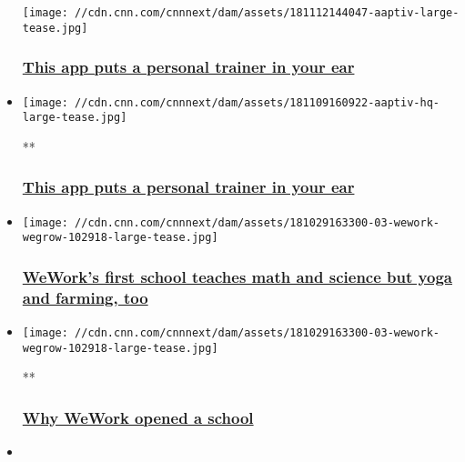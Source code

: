 \begin{itemize}
  \texttt{[image: //cdn.cnn.com/cnnnext/dam/assets/181112144047-aaptiv-large-tease.jpg]}

  \hypertarget{this-app-puts-a-personal-trainer-in-your-ear}{%
  \subsubsection{\texorpdfstring{\href{/2018/11/12/tech/aaptiv-app/index.html}{This
  app puts a personal trainer in your
  ear}}{This app puts a personal trainer in your ear}}\label{this-app-puts-a-personal-trainer-in-your-ear}}
\item
  \href{/videos/business/2018/11/09/aaptiv-personal-trainer-audio.cnn-business}{}

  \texttt{[image: //cdn.cnn.com/cnnnext/dam/assets/181109160922-aaptiv-hq-large-tease.jpg]}

  **

  \hypertarget{this-app-puts-a-personal-trainer-in-your-ear-1}{%
  \subsubsection{\texorpdfstring{\href{/videos/business/2018/11/09/aaptiv-personal-trainer-audio.cnn-business}{This
  app puts a personal trainer in your
  ear}}{This app puts a personal trainer in your ear}}\label{this-app-puts-a-personal-trainer-in-your-ear-1}}
\item
  \href{/2018/10/30/tech/wework-school-wegrow/index.html}{}

  \texttt{[image: //cdn.cnn.com/cnnnext/dam/assets/181029163300-03-wework-wegrow-102918-large-tease.jpg]}

  \hypertarget{weworks-first-school-teaches-math-and-science-but-yoga-and-farming-too}{%
  \subsubsection{\texorpdfstring{\href{/2018/10/30/tech/wework-school-wegrow/index.html}{WeWork's
  first school teaches math and science but yoga and farming,
  too}}{WeWork's first school teaches math and science but yoga and farming, too}}\label{weworks-first-school-teaches-math-and-science-but-yoga-and-farming-too}}
\item
  \href{/videos/business/2018/10/29/wework-wegrow-school-zw-mc-orig.cnn-business}{}

  \texttt{[image: //cdn.cnn.com/cnnnext/dam/assets/181029163300-03-wework-wegrow-102918-large-tease.jpg]}

  **

  \hypertarget{why-wework-opened-a-school}{%
  \subsubsection{\texorpdfstring{\href{/videos/business/2018/10/29/wework-wegrow-school-zw-mc-orig.cnn-business}{Why
  WeWork opened a
  school}}{Why WeWork opened a school}}\label{why-wework-opened-a-school}}
\item
\end{itemize}

